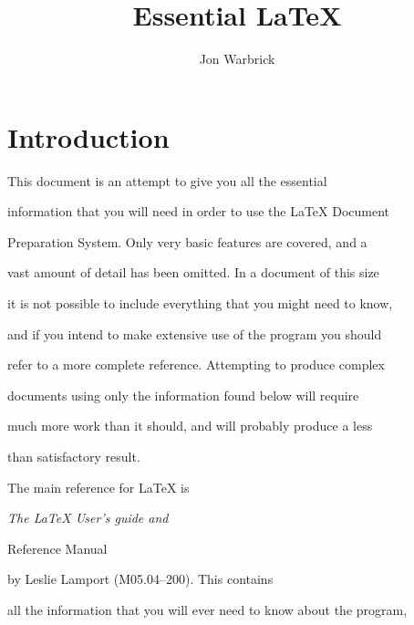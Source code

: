 


\newcommand{\fn}[1]{\hbox{\tt #1}}

\newcommand{\llo}[1]{(see line #1)}

\newcommand{\lls}[1]{(see lines #1)}

\newcommand{\bs}{$\backslash$}



\title{Essential \LaTeX}

\author{Jon Warbrick}








\maketitle



\section{Introduction}



This document is an attempt to give you all the essential

information that you will need in order to use the \LaTeX{} Document

Preparation System.  Only very basic features are covered, and a

vast amount of detail has been omitted.  In a document of this size

it is not possible to include everything that you might need to know,

and if you intend to make extensive use of the program you should

refer to a more complete reference.  Attempting to produce complex

documents using only the information found below will require

much more work than it should, and will probably produce a less

than satisfactory result.



The main reference for \LaTeX{} is {\em The \LaTeX{} User's guide and

Reference Manual\/} by Leslie Lamport (M05.04--200).  This contains

all the information that you will ever need to know about the program,

